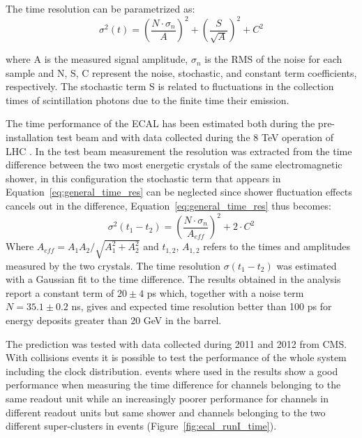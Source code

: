 The time resolution can be parametrized as:
\begin{equation}
  \sigma^2(t) = \left( \frac{N\cdot\sigma_n}{A} \right)^2 + \left( \frac{S}{\sqrt{A}} \right)^2 + C^2  
\end{equation}
\label{eq:general_time_res}

where A is the measured signal amplitude, $\sigma_n$ is the RMS of the noise for each sample and
N, S, C represent the noise, stochastic, and constant term coefficients, respectively.
The stochastic term S is related to fluctuations in the collection times of scintillation photons due to
the finite time their emission.


The time performance of the ECAL has been estimated both during the pre-installation test beam \cite{ecal_time_reco}
and with data collected during the 8 TeV operation of LHC \cite{delRe_time_ecal}.
In the test beam measurement the resolution was extracted from the time difference between the two most energetic crystals
of the same electromagnetic shower, in this configuration the stochastic term that appears in Equation~\ref{eq:general_time_res}
can be neglected since shower fluctuation effects cancels out in the difference, Equation~\ref{eq:general_time_res} thus becomes:
\begin{equation}
  \sigma^2(t_1 - t_2) = \left( \frac{N\cdot\sigma_n}{A_{eff}} \right)^2 + 2 \cdot C^2
\end{equation}
\label{eq:ecal_time_res}
Where $A_{eff} = A_1A_2/\sqrt{A_1^2+A_2^2}$ and $t_{1,2}$, $A_{1,2}$ refers to the times and amplitudes measured by the two crystals. 
The time resolution $\sigma(t_1-t_2)$ was estimated with a Gaussian fit to the time difference.
The results obtained in the analysis report a constant term of $20 \pm 4$ ps which, together with a noise term $N = 35.1\pm 0.2$ ns,
gives and expected time resolution better than 100 ps for energy deposits greater than 20 GeV in the barrel.

The prediction was tested with data collected during 2011 and 2012 from CMS. With collisions events it is possible to
test the performance of the whole system including the clock distribution. \Zee events where used in \cite{delRe_time_ecal}
the results show a good performance when measuring the time difference for channels belonging to the same readout unit while
an increasingly poorer performance for channels in different readout units but same shower and channels belonging to
the two different super-clusters in \Zee events (Figure~\ref{fig:ecal_runI_time}).

